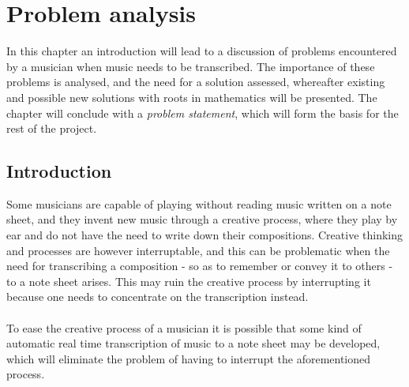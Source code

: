 \chapter{Problem analysis} \label{ch1}
In this chapter an introduction will lead to a discussion of problems encountered by a musician when music needs to be transcribed. The importance of these problems is analysed, and the need for a solution assessed, whereafter existing and possible new solutions with roots in mathematics will be presented. The chapter will conclude with a \textit{problem statement}, which will form the basis for the rest of the project.

\section{Introduction}
Some musicians are capable of playing without reading music written on a note sheet, and they invent new music through a creative process, where they play by ear and do not have the need to write down their compositions. Creative thinking and processes are however interruptable, and this can be problematic when the need for transcribing a composition - so as to remember or convey it to others - to a note sheet arises. This may ruin the creative process by interrupting it because one needs to concentrate on the transcription instead.
\\ \\
To ease the creative process of a musician it is possible that some kind of automatic real time transcription of music to a note sheet may be developed, which will eliminate the problem of having to interrupt the aforementioned process.

